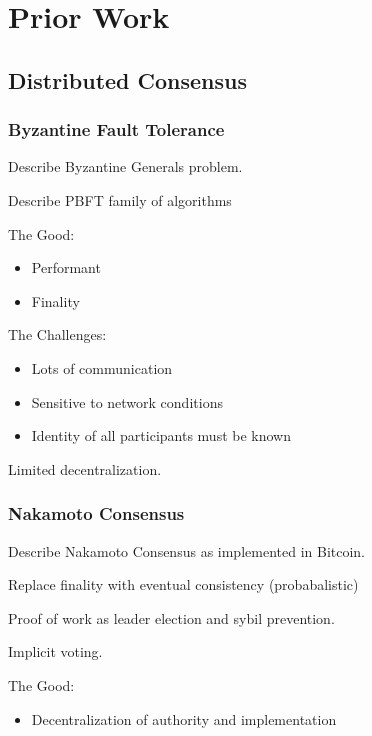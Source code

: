 \section{Prior Work}
\label{sec_priorart}

\subsection{Distributed Consensus}
\subsubsection{Byzantine Fault Tolerance}

Describe Byzantine Generals problem.

Describe PBFT family of algorithms

The Good:
\begin{itemize}
\item Performant
\item Finality
\end{itemize}

The Challenges:
\begin{itemize}
\item Lots of communication
\item Sensitive to network conditions
\item Identity of all participants must be known
\end{itemize}

Limited decentralization.

\subsubsection{Nakamoto Consensus}

Describe Nakamoto Consensus as implemented in Bitcoin.

Replace finality with eventual consistency (probabalistic)

Proof of work as leader election and sybil prevention.

Implicit voting.

The Good:
\begin{itemize}
\item Decentralization of authority and implementation
\end{itemize}

